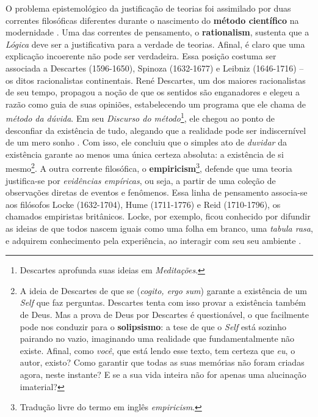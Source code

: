 \documentclass[./main.tex]{subfiles}
\begin{document}
\par O problema epistemológico da justificação de teorias foi assimilado por duas correntes filosóficas diferentes durante o nascimento do \textbf{método científico} na modernidade \cite{sep-rationalism-empiricism}. Uma das correntes de pensamento, o \textbf{\gls{rationalism}}, sustenta que a \textit{Lógica} deve ser a justificativa para a verdade de teorias. Afinal, é claro que uma explicação incoerente não pode ser verdadeira. Essa posição costuma ser associada a Descartes (1596-1650), Spinoza (1632-1677) e Leibniz (1646-1716) -- os ditos racionalistas continentais. René Descartes, um dos maiores racionalistas de seu tempo, propagou a noção de que os sentidos são enganadores e elegeu a razão como guia de suas opiniões, estabelecendo um programa que ele chama de \textit{método da dúvida}. Em seu \textit{Discurso do método}\footnote{Descartes aprofunda suas ideias em \textit{Meditações}.}, ele chegou ao ponto de desconfiar da existência de tudo, alegando que a realidade pode ser indiscernível de um mero sonho \cite{descartes2008discurso}. Com isso, ele concluiu que o simples ato de \textit{duvidar} da existência garante ao menos uma única certeza absoluta: a existência de si mesmo\footnote{A ideia de Descartes de que se  (\textit{cogito, ergo sum}) garante a existência de um \textit{Self} que faz perguntas. Descartes tenta com isso provar a existência também de Deus. Mas a prova de Deus por Descartes é questionável, o que facilmente pode nos conduzir para o \textbf{solipsismo}: a tese de que o \textit{Self} está sozinho pairando no vazio, imaginando uma realidade que fundamentalmente não existe. Afinal, como \textit{você}, que está lendo esse texto, tem certeza que \textit{eu}, o autor, existo? Como garantir que todas as suas memórias não foram criadas agora, neste instante?  E se a sua vida inteira não for apenas uma alucinação imaterial?}. A outra corrente filosófica, o \textbf{\gls{empiricism}}\footnote{Tradução livre do termo em inglês \textit{empiricism}.}, defende que uma teoria justifica-se por \textit{evidências empíricas}, ou seja, a partir de uma coleção de observações diretas de eventos e fenômenos. Essa linha de pensamento associa-se aos filósofos Locke (1632-1704), Hume (1711-1776) e Reid (1710-1796), os chamados empiristas britânicos. Locke, por exemplo, ficou conhecido por difundir as ideias de que todos nascem iguais como uma folha em branco, uma \textit{tabula rasa}, e adquirem conhecimento pela experiência, ao interagir com seu seu ambiente \cite{sep-locke}. 
\end{document}
